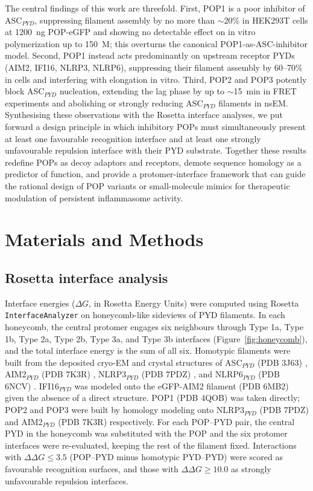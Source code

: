 \documentclass[11pt]{article}
\begin{document}
The central findings of this work are threefold. First, POP1 is a poor
inhibitor of ASC$_{PYD}$, suppressing filament assembly by no more than
$\sim$20\% in HEK293T cells at 1200~ng POP-eGFP and showing no detectable
effect on in vitro polymerization up to 150~\textmu M; this overturns the
canonical POP1-as-ASC-inhibitor model. Second, POP1 instead acts
predominantly on upstream receptor PYDs (AIM2, IFI16, NLRP3, NLRP6),
suppressing their filament assembly by 60--70\% in cells and interfering
with elongation in vitro. Third, POP2 and POP3 potently block ASC$_{PYD}$
nucleation, extending the lag phase by up to $\sim$15~min in FRET
experiments and abolishing or strongly reducing ASC$_{PYD}$ filaments in
nsEM. Synthesising these observations with the Rosetta interface analyses,
we put forward a design principle in which inhibitory POPs must
simultaneously present at least one favourable recognition interface and
at least one strongly unfavourable repulsion interface with their PYD
substrate. Together these results redefine POPs as decoy adaptors and
receptors, demote sequence homology as a predictor of function, and provide
a protomer-interface framework that can guide the rational design of POP
variants or small-molecule mimics for therapeutic modulation of persistent
inflammasome activity.

\section{Materials and Methods}

\subsection{Rosetta interface analysis}

Interface energies ($\Delta G$, in Rosetta Energy Units) were computed
using Rosetta \texttt{InterfaceAnalyzer} on honeycomb-like sideviews of PYD
filaments. In each honeycomb, the central protomer engages six neighbours
through Type 1a, Type 1b, Type 2a, Type 2b, Type 3a, and Type 3b interfaces
(Figure~\ref{fig:honeycomb}), and the total interface energy is the sum of
all six. Homotypic filaments were built from the deposited cryo-EM and
crystal structures of ASC$_{PYD}$ (PDB 3J63) \citep{lu2014unified},
AIM2$_{PYD}$ (PDB 7K3R) \citep{matyszewski2021distinct}, NLRP3$_{PYD}$
(PDB 7PDZ) \citep{hochheiser2022directionality}, and NLRP6$_{PYD}$
(PDB 6NCV) \citep{shen2019nlrp6}. IFI16$_{PYD}$ was modeled onto the
eGFP-AIM2 filament (PDB 6MB2) given the absence of a direct structure.
POP1 (PDB 4QOB) was taken directly; POP2 and POP3 were built by homology
modeling onto NLRP3$_{PYD}$ (PDB 7PDZ) and AIM2$_{PYD}$ (PDB 7K3R)
respectively. For each POP--PYD pair, the central PYD in the honeycomb was
substituted with the POP and the six protomer interfaces were re-evaluated,
keeping the rest of the filament fixed. Interactions with
$\Delta\Delta G \leq 3.5$ (POP--PYD minus homotypic PYD--PYD) were scored
as favourable recognition surfaces, and those with $\Delta\Delta G \geq 10.0$
as strongly unfavourable repulsion interfaces.
\end{document}
